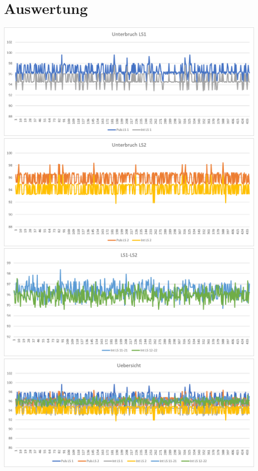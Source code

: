 \section{Auswertung}\label{app:Auswertung}
\includegraphics[width=\textwidth]{images/auswertungLS1.png}\\
\includegraphics[width=\textwidth]{images/auswertungLS2.png}\\
\includegraphics[width=\textwidth]{images/auswertungLS1LS2.png}\\
\includegraphics[width=\textwidth]{images/auswertungInt.png}\\

